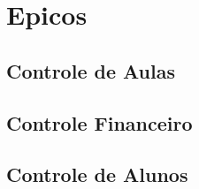 \section[Epicos]{Epicos}
\subsection[Controle de Aulas]{Controle de Aulas}
\subsection[Controle Financeiro]{Controle Financeiro}
\subsection[Controle de Alunos]{Controle de Alunos}
